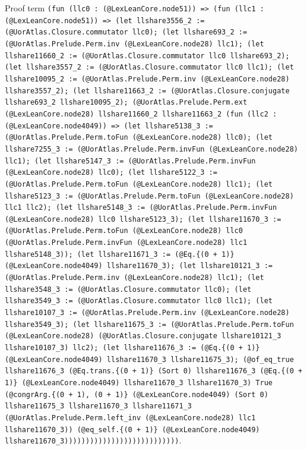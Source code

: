 \documentclass[11pt]{article}
\begin{document}
\noindent Proof term \texttt{(fun (llc0 : (@LexLeanCore.node51)) => (fun (llc1 : (@LexLeanCore.node51)) => (let llshare3556\_2 := (@UorAtlas.Closure.commutator llc0); (let llshare693\_2 := (@UorAtlas.Prelude.Perm.inv (@LexLeanCore.node28) llc1); (let llshare11660\_2 := (@UorAtlas.Closure.commutator llc0 llshare693\_2); (let llshare3557\_2 := (@UorAtlas.Closure.commutator llc0 llc1); (let llshare10095\_2 := (@UorAtlas.Prelude.Perm.inv (@LexLeanCore.node28) llshare3557\_2); (let llshare11663\_2 := (@UorAtlas.Closure.conjugate llshare693\_2 llshare10095\_2); (@UorAtlas.Prelude.Perm.ext (@LexLeanCore.node28) llshare11660\_2 llshare11663\_2 (fun (llc2 : (@LexLeanCore.node4049)) => (let llshare5138\_3 := (@UorAtlas.Prelude.Perm.toFun (@LexLeanCore.node28) llc0); (let llshare7255\_3 := (@UorAtlas.Prelude.Perm.invFun (@LexLeanCore.node28) llc1); (let llshare5147\_3 := (@UorAtlas.Prelude.Perm.invFun (@LexLeanCore.node28) llc0); (let llshare5122\_3 := (@UorAtlas.Prelude.Perm.toFun (@LexLeanCore.node28) llc1); (let llshare5123\_3 := (@UorAtlas.Prelude.Perm.toFun (@LexLeanCore.node28) llc1 llc2); (let llshare5148\_3 := (@UorAtlas.Prelude.Perm.invFun (@LexLeanCore.node28) llc0 llshare5123\_3); (let llshare11670\_3 := (@UorAtlas.Prelude.Perm.toFun (@LexLeanCore.node28) llc0 (@UorAtlas.Prelude.Perm.invFun (@LexLeanCore.node28) llc1 llshare5148\_3)); (let llshare11671\_3 := (@Eq.\{(0 + 1)\} (@LexLeanCore.node4049) llshare11670\_3); (let llshare10121\_3 := (@UorAtlas.Prelude.Perm.inv (@LexLeanCore.node28) llc1); (let llshare3548\_3 := (@UorAtlas.Closure.commutator llc0); (let llshare3549\_3 := (@UorAtlas.Closure.commutator llc0 llc1); (let llshare10107\_3 := (@UorAtlas.Prelude.Perm.inv (@LexLeanCore.node28) llshare3549\_3); (let llshare11675\_3 := (@UorAtlas.Prelude.Perm.toFun (@LexLeanCore.node28) (@UorAtlas.Closure.conjugate llshare10121\_3 llshare10107\_3) llc2); (let llshare11676\_3 := (@Eq.\{(0 + 1)\} (@LexLeanCore.node4049) llshare11670\_3 llshare11675\_3); (@of\_eq\_true llshare11676\_3 (@Eq.trans.\{(0 + 1)\} (Sort 0) llshare11676\_3 (@Eq.\{(0 + 1)\} (@LexLeanCore.node4049) llshare11670\_3 llshare11670\_3) True (@congrArg.\{(0 + 1), (0 + 1)\} (@LexLeanCore.node4049) (Sort 0) llshare11675\_3 llshare11670\_3 llshare11671\_3 (@UorAtlas.Prelude.Perm.left\_inv (@LexLeanCore.node28) llc1 llshare11670\_3)) (@eq\_self.\{(0 + 1)\} (@LexLeanCore.node4049) llshare11670\_3)))))))))))))))))))))))))))}.\par
\end{document}
